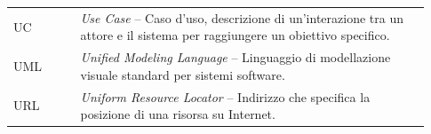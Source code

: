 \begin{longtable}{p{0.15\linewidth} p{0.78\linewidth}}
UC & \textit{Use Case} -- Caso d'uso, descrizione di un'interazione tra un attore e il sistema per raggiungere un obiettivo specifico. \\
\addlinespace

UML & \textit{Unified Modeling Language} -- Linguaggio di modellazione visuale standard per sistemi software. \\
\addlinespace

URL & \textit{Uniform Resource Locator} -- Indirizzo che specifica la posizione di una risorsa su Internet. \\

\end{longtable}
